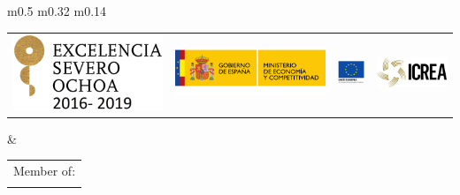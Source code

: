 \documentclass[a0paper,portrait]{baposter}
\begin{document}
\begin{poster}
{\begin{center}
\begin{tabular}{m{} m{} m{}}
\begin{tabular}{llll}
\includegraphics[height=\logoheight]{Logos/Severo-Ochoa.png} & \hspace{2mm}
\includegraphics[height=\logoheight]{Logos/MINECO.png} & \hspace{2mm}
\includegraphics[height=\logoheight]{Logos/UE-FEDER.png} & \hspace{2mm}
\includegraphics[height=\logoheight]{Logos/ICREA.png} 
\end{tabular}
&
\begin{tabular}{l}
\color{icfoblue} \small Member of: 
\\ \arrayrulecolor{icfoblue}\hline

\end{tabular}
\end{tabular}
\end{center}}
\end{poster}
\end{document}
